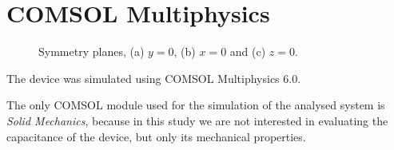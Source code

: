 \documentclass[lettersize,journal]{IEEEtran}
\begin{document}
    \section{COMSOL Multiphysics}
    \begin{figure}[!ht]
        \centering
        \hfil
        \hfil
        \caption{Symmetry planes, (a) \(y=0\), (b) \(x=0\) and (c) \(z=0\).}
        \label{fig:symmetry-planes}
    \end{figure}
        The device was simulated using COMSOL Multiphysics 6.0.
        
        The only COMSOL module used for the simulation of the analysed system is \textit{Solid Mechanics}, because in this study we are not interested in evaluating the capacitance of the device, but only its mechanical properties.
        
\end{document}

